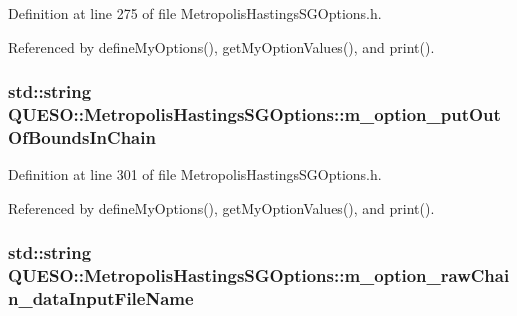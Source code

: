 Definition at line 275 of file Metropolis\-Hastings\-S\-G\-Options.\-h.



Referenced by define\-My\-Options(), get\-My\-Option\-Values(), and print().

\hypertarget{class_q_u_e_s_o_1_1_metropolis_hastings_s_g_options_a6d1856b0435c6dfcac6b75ec36829b47}{
\subsubsection[{m\-\_\-option\-\_\-put\-Out\-Of\-Bounds\-In\-Chain}]{\setlength{\rightskip}{0pt plus 5cm}std\-::string Q\-U\-E\-S\-O\-::\-Metropolis\-Hastings\-S\-G\-Options\-::m\-\_\-option\-\_\-put\-Out\-Of\-Bounds\-In\-Chain\hspace{0.3cm}{\ttfamily [private]}}}\label{class_q_u_e_s_o_1_1_metropolis_hastings_s_g_options_a6d1856b0435c6dfcac6b75ec36829b47}


Definition at line 301 of file Metropolis\-Hastings\-S\-G\-Options.\-h.



Referenced by define\-My\-Options(), get\-My\-Option\-Values(), and print().

\hypertarget{class_q_u_e_s_o_1_1_metropolis_hastings_s_g_options_a5527cd4da92ce0da6488df811ae5a0b0}{
\subsubsection[{m\-\_\-option\-\_\-raw\-Chain\-\_\-data\-Input\-File\-Name}]{\setlength{\rightskip}{0pt plus 5cm}std\-::string Q\-U\-E\-S\-O\-::\-Metropolis\-Hastings\-S\-G\-Options\-::m\-\_\-option\-\_\-raw\-Chain\-\_\-data\-Input\-File\-Name\hspace{0.3cm}{\ttfamily [private]}}}\label{class_q_u_e_s_o_1_1_metropolis_hastings_s_g_options_a5527cd4da92ce0da6488df811ae5a0b0}


